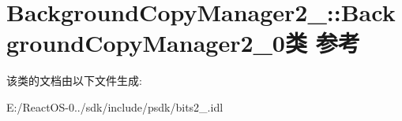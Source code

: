 \hypertarget{class_background_copy_manager2__0_1_1_background_copy_manager2__0}{}\section{Background\+Copy\+Manager2\+\_\+:\+:Background\+Copy\+Manager2\+\_\+0类 参考}
\label{class_background_copy_manager2__0_1_1_background_copy_manager2__0}


该类的文档由以下文件生成\+:\begin{DoxyCompactItemize}
\item 
E\+:/\+React\+O\+S-\/0../sdk/include/psdk/bits2\+\_.\+idl\end{DoxyCompactItemize}

